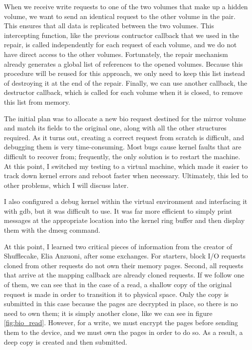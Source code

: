 \documentclass[a4paper,11pt,oneside]{report}
\begin{document}
When we receive write requests to one of the two volumes that make up a hidden volume, we want to send an identical request to the other volume in the pair. This ensures that all data is replicated between the two volumes. This intercepting function, like the previous contructor callback that we used in the repair, is called independently for each request of each volume, and we do not have direct access to the other volumes. Fortunately, the repair mechanism already generates a global list of references to the opened volumes. Because this procedure will be reused for this approach, we only need to keep this list instead of destroying it at the end of the repair. Finally, we can use another callback, the destructor callback, which is called for each volume when it is closed, to remove this list from memory.

The initial plan was to allocate a new bio request destined for the mirror volume and match its fields to the original one, along with all the other structures required. As it turns out, creating a correct request from scratch is difficult, and debugging them is very time-consuming. Most bugs cause kernel faults that are difficult to recover from; frequently, the only solution is to restart the machine. At this point, I switched my testing to a virtual machine, which made it easier to track down kernel errors and reboot faster when necessary. Ultimately, this led to other problems, which I will discuss later.

I also configured a debug kernel within the virtual environment and interfacing it with gdb\cite{VMGDB}, but it was difficult to use. It was far more efficient to simply print messages at the appropriate location into the kernel ring buffer and then display them with the dmesg command\cite{dmesg_man}.

At this point, I learned two critical pieces of information from the creator of Shufflecake, Elia Anzuoni, after some exchanges. For starters, block I/O requests cloned from other requests do not own their memory pages. Second, all requests that arrive at the mapping callback are already cloned requests. If we follow one of them, we can see that in the case of a read, a shallow copy of the original request is made in order to transition it to physical space. Only the copy is submitted in this case because the pages are decrypted in place, so there is no need to own them; it is simply another clone, like we can see in figure \ref{fig:bio_read}. However, for a write, we must encrypt the pages before sending them to the device, and we must own the pages in order to do so. As a result, a deep copy is created and then submitted.
\end{document}
